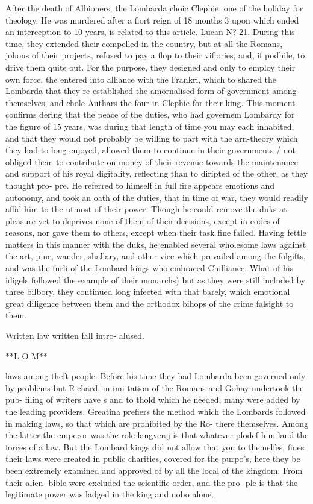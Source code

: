 \documentclass{article}
\begin{document}
After the death of Albioners, the Lombarda choic Clephie, one of the holiday for theology. He was murdered after a flort reign of 18 months 3 upon which ended an interception to 10 years, is related to this article. Lucan N? 21. During this time, they extended their compelled in the country, but at all the Romans, johous of their projects, refused to pay a flop to their viflories, and, if podhile, to drive them quite out. For the purpose, they designed and only to employ their own force, the entered into alliance with the Frankri, which to shared the Lombarda that they re-established the amornalised form of government among themselves, and chole Authars the four in Clephie for their king. This moment confirms dering that the peace of the duties, who had governem Lombardy for the figure of 15 years, was during that length of time you may each inhabited, and that they would not probably be willing to part with the arn-theory which they had to long enjoyed, allowed them to continue in their governments / not obliged them to contribute on money of their revenue towards the maintenance and support of his royal digitality, reflecting than to diripted of the other, as they thought pro- pre. He referred to himself in full fire appears emotions and autonomy, and took an oath of the duties, that in time of war, they would readily affid him to the utmost of their power. Though he could remove the duks at pleasure yet to deprives none of them of their decisions, except in codes of reasons, nor gave them to others, except when their task fine failed. Having fettle matters in this manner with the duks, he enabled several wholesome laws against the art, pine, wander, shallary, and other vice which prevailed among the folgifts, and was the furli of the Lombard kings who embraced Chilliance. What of his idigels followed the example of their monarchs) but as they were still included by three bilbory, they continued long infected with that barely, which emotional great diligence between them and the orthodox bihops of the crime falsight to them.

Written law written fall intro- alused.

**L O M**

laws among theft people. Before his time they had Lombarda been governed only by problems but Richard, in imi-tation of the Romans and Gohay undertook the pub- filing of writers have s and to thold which he needed, many were added by the leading providers. Greatina prefiers the method which the Lombards followed in making laws, so that which are prohibited by the Ro- there themselves. Among the latter the emperor was the role langversj is that whatever plodef him land the forces of a law. But the Lombard kings did not allow that you to themelfes, fines their laws were created in public charities, covered for the purpo’s, here they be been extremely examined and approved of by all the local of the kingdom. From their alien- bible were excluded the scientific order, and the pro- ple is that the legitimate power was ladged in the king and nobo alone.
\end{document}
